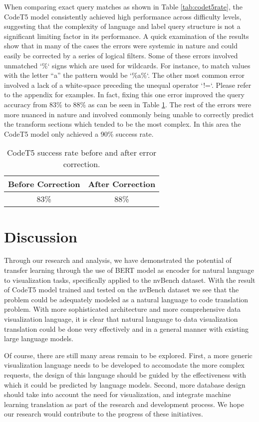 \documentclass[
	a4paper, %
	10pt, %
	unnumberedsections, %
	twoside, %
]{t0003}
\begin{document}
When comparing exact query matches as shown in Table \ref{tab:codet5rate}, the CodeT5 model consistently achieved high performance across difficulty levels, suggesting that the complexity of language and label query structure is not a significant limiting factor in its performance. A quick examination of the results show that in many of the cases the errors were systemic in nature and could easily be corrected by a series of logical filters. Some of these errors involved unmatched `\%` signs which are used for wildcards. For instance, to match values with the letter “a” the pattern would be `\%a\%`. The other most common error involved a lack of a white-space preceding the unequal operator `!=`. Please refer to the appendix for examples. In fact, fixing this one error improved the query accuracy from 83\% to 88\% as can be seen in Table \ref{tab:codet5error}. The rest of the errors were more nuanced in nature and involved commonly being unable to correctly predict the transform sections which tended to be the most complex. In this area the CodeT5 model only achieved a 90\% success rate.

\begin{table}
	\caption{CodeT5 success rate before and after error correction.}
	\centering
	\begin{tabular}{cc}
		\toprule
		Before Correction & After Correction \\
		\midrule
		83\% & 88\% \\
		\bottomrule
	\end{tabular}
	\label{tab:codet5error}
\end{table}

\section{Discussion}

Through our research and analysis, we have demonstrated the potential of transfer learning through the use of BERT model as encoder for natural language to visualization tasks, specifically applied to the nvBench dataset. With the result of CodeT5 model trained and tested on the nvBench dataset we see that the problem could be adequately modeled as a natural language to code translation problem. With more sophisticated architecture and more comprehensive data visualization language, it is clear that natural language to data visualization translation could be done very effectively and in a general manner with existing large language models.

Of course, there are still many areas remain to be explored. First, a more generic visualization language needs to be developed to accomodate the more complex requests, the design of this language should be guided by the effectiveness with which it could be predicted by language models. Second, more database design should take into account the need for visualization, and integrate machine learning translation as part of the research and development process. We hope our research would contribute to the progress of these initiatives.
\end{document}
